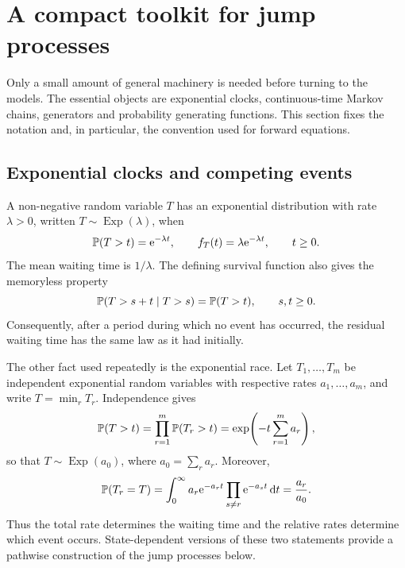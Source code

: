 \section{A compact toolkit for jump processes}
\label{sec:ctmc-pgf}

Only a small amount of general machinery is needed before turning to the models.
The essential objects are exponential clocks, continuous-time Markov chains,
generators and probability generating functions.  This section fixes the notation
and, in particular, the convention used for forward equations.

\subsection{Exponential clocks and competing events}

A non-negative random variable \(T\) has an exponential distribution with rate
\(\lambda>0\), written \(T\sim\operatorname{Exp}(\lambda)\), when
\begin{equation}
  \mathbb{P}(T>t)=\mathrm{e}^{-\lambda t},
  \qquad
  f_T(t)=\lambda\mathrm{e}^{-\lambda t},
  \qquad t\geq0.
  \label{eq:exponential-law}
\end{equation}
The mean waiting time is \(1/\lambda\).  The defining survival function also gives
the memoryless property
\begin{equation}
  \mathbb{P}(T>s+t\mid T>s)=\mathbb{P}(T>t),
  \qquad s,t\geq0.
  \label{eq:memoryless}
\end{equation}
Consequently, after a period during which no event has occurred, the residual
waiting time has the same law as it had initially.

The other fact used repeatedly is the exponential race.  Let
\(T_1,\ldots,T_m\) be independent exponential random variables with respective
rates \(a_1,\ldots,a_m\), and write \(T=\min_rT_r\).  Independence gives
\begin{equation}
  \mathbb{P}(T>t)=\prod_{r=1}^{m}\mathbb{P}(T_r>t)
  =\exp\!\left(-t\sum_{r=1}^{m}a_r\right),
\end{equation}
so that \(T\sim\operatorname{Exp}(a_0)\), where \(a_0=\sum_ra_r\).  Moreover,
\begin{equation}
  \mathbb{P}(T_r=T)=\int_0^\infty a_r\mathrm{e}^{-a_rt}
       \prod_{s\neq r}\mathrm{e}^{-a_st}\,\mathrm{d} t
  =\frac{a_r}{a_0}.
  \label{eq:exponential-race}
\end{equation}
Thus the total rate determines the waiting time and the relative rates determine
which event occurs.  State-dependent versions of these two statements provide a
pathwise construction of the jump processes below.

